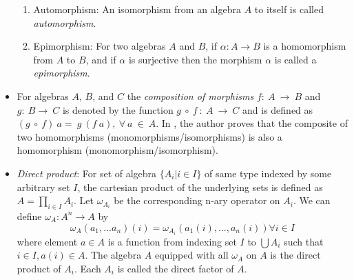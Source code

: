 \begin{itemize}
\begin{enumerate}
        \item Automorphism: An isomorphism from an algebra $A$ to itself is
        called \textit{automorphism}.

        \item Epimorphism: For two algebras $A$ and $B$, if \(\alpha : A
        \rightarrow B \) is a homomorphism from $A$ to $B$, and if \(\alpha\) is
        surjective then the morphism \(\alpha\) is called a
        \textit{epimorphism}.
    \end{enumerate}

    \item For algebras $A$, $B$, and $C$ the \textit{composition of morphisms}
    $f:\ A \ \rightarrow \ B$ and $g:\ B \rightarrow\ C$ is denoted by the
    function $g\ \circ \ f\ :\ A\ \rightarrow \ C$ and is defined as $(g\ \circ
    \ f)\ a = \ g\ (f\ a), \ \forall \ a\ \in\ A$. In
    \cite{sankappanavar1981course}, the author proves that the composite of two
    homomorphisms (monomorphisms/isomorphisms) is also a homomorphism
    (monomorphism/isomorphism).
    
    \item \textit{Direct product}: For set of algebra $\{ A_i | i \in I \}$ of
    same type indexed by some arbitrary set $I$, the cartesian product of the
    underlying sets is defined as $A = \displaystyle \prod_{i\in I} A_i$. Let
    $\omega_{A_i}$ be the corresponding n-ary operator on $A_i$. We can define
    $\omega_A : A^{n} \rightarrow A$ by \[ \omega_A(a_1,...a_n)(i) =
    \omega_{A_i} (a_1(i),...,a_n(i)) \forall i \in I\] where element $a \in A$
    is a function from indexing set $I$ to $\bigcup A_i$ such that $i \in I,
    a(i) \in A$. The algebra $A$ equipped with all $\omega_A$ on $A$ is the
    direct product of $A_i$. Each $A_i$ is called the direct factor of $A$.

\end{itemize}